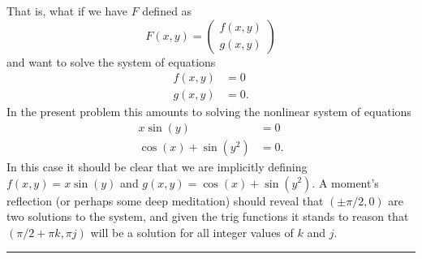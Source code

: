 \documentclass[
]{book}
\theoremstyle{definition}
\theoremstyle{definition}
\theoremstyle{definition}
\theoremstyle{remark}
\begin{document}
That is, what if we have \(F\) defined as
\[F(x,y) = \begin{pmatrix} f(x,y) \\ g(x,y) \end{pmatrix}\]
and want to solve the system of equations
\[\begin{aligned}
    f(x,y) &= 0 \\ 
    g(x,y) &= 0. \end{aligned}\]
In the present problem this amounts to solving the nonlinear system of equations
\[\begin{aligned}
    x\sin(y) &= 0 \\
    \cos(x) + \sin(y^2) &=0.\end{aligned}\]
In this case it should be clear that we are implicitly defining \(f(x,y) = x\sin(y)\) and \(g(x,y) = \cos(x) + \sin(y^2)\). A moment's reflection (or perhaps some deep meditation) should reveal that \((\pm\pi/2,0)\) are two solutions to the system, and given the trig functions it stands to reason that \((\pi/2 + \pi k,\pi j)\) will be a solution for all integer values of \(k\) and \(j\).

\begin{center}\rule{0.5\linewidth}{0.5pt}\end{center}
\end{document}

